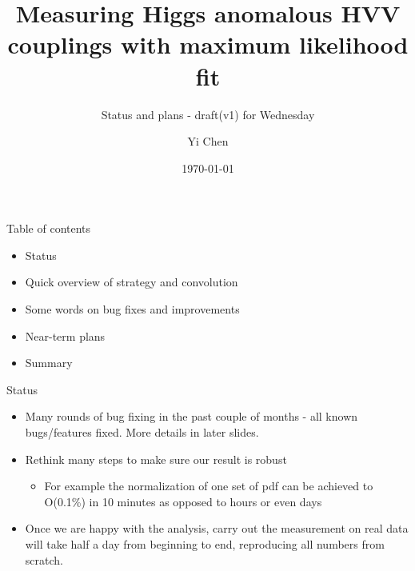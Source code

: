 \documentclass[11pt,t]{beamer}
\title{Measuring Higgs anomalous HVV couplings with maximum likelihood fit}
\subtitle{Status and plans - draft(v1) for Wednesday}
\author{Yi Chen}
\institute{California Institute of Technology\\~\\Caltech group meeting}
\date{\today}
\begin{document}
\begin{frame}[plain]
   \titlepage
\end{frame}

\begin{frame}{Table of contents}
   \begin{itemize}
   \item Status
   \item Quick overview of strategy and convolution
   \item Some words on bug fixes and improvements
   \item Near-term plans
   \item Summary
   \end{itemize}
\end{frame}

\begin{frame}{Status}
   \begin{itemize}
   \item Many rounds of bug fixing in the past couple of months - all known bugs/features fixed.
   More details in later slides.
   \item Rethink many steps to make sure our result is robust
      \begin{itemize}
      \item For example the normalization of one set of pdf can be achieved to O(0.1\%) in 10 minutes
      as opposed to hours or even days
      \end{itemize}
   \item Once we are happy with the analysis, carry out the measurement on real data
   will take half a day from beginning to end, reproducing all numbers from scratch.
   \end{itemize}
\end{frame}
\end{document}
